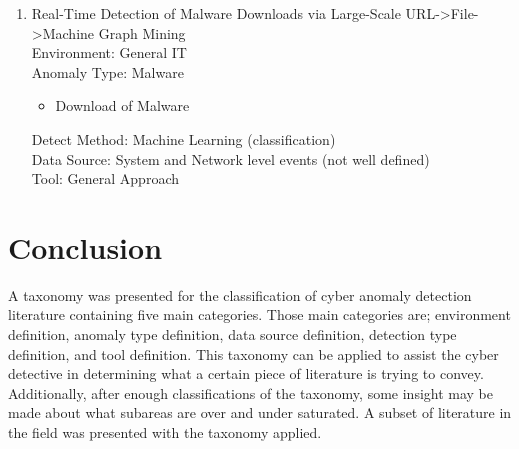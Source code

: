 \documentclass[10pt]{IEEEtran}
\begin{document}
\begin{enumerate}
    \item
    Real-Time Detection of Malware Downloads via Large-Scale URL->File->Machine Graph Mining\cite{rahbarinia2016real}\\
    Environment: General IT\\
    Anomaly Type: Malware
    \begin{itemize}
        \item Download of Malware
    \end{itemize}
    Detect Method: Machine Learning (classification) \\
    Data Source: System and Network level events (not well defined) \\
    Tool: General Approach
\end{enumerate}

\section{Conclusion}
A taxonomy was presented for the classification of cyber anomaly detection literature containing five main categories. Those main categories are; environment definition, anomaly type definition, data source definition, detection type definition, and tool definition. This taxonomy can be applied to assist the cyber detective in determining what a certain piece of literature is trying to convey. Additionally, after enough classifications of the taxonomy, some insight may be made about what subareas are over and under saturated. 
A subset of literature in the field was presented with the taxonomy applied. 



\end{document}
